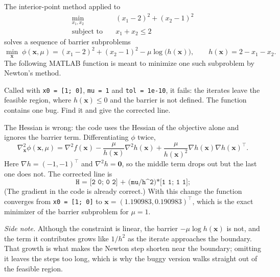 \begin{exercise} %
    
    The interior-point method applied to
    \[
    \begin{aligned}
        \min_{x_1, x_2} \quad & (x_1 - 2)^2 + (x_2 - 1)^2 \\
        \text{subject to} \quad & x_1 + x_2 \le 2
    \end{aligned}
    \]
    solves a sequence of barrier subproblems
    \[
        \min_{\mathbf{x}} \; \phi(\mathbf{x}, \mu) = (x_1 - 2)^2 + (x_2 - 1)^2 - \mu \log\big(h(\mathbf{x})\big),
        \qquad h(\mathbf{x}) = 2 - x_1 - x_2 .
    \]
    The following MATLAB function is meant to minimize one such subproblem by Newton's method.
    
    Called with \texttt{x0 = [1; 0]}, \texttt{mu = 1} and \texttt{tol = 1e-10}, it fails: the iterates leave the feasible region, where $h(\mathbf{x}) \le 0$ and the barrier is not defined. The function contains one bug. Find it and give the corrected line.
    
\end{exercise}

\begin{solution}
    
    The Hessian is wrong: the code uses the Hessian of the objective alone and ignores the barrier term. Differentiating $\phi$ twice,
    \[
        \nabla^2_{\mathbf{x}} \phi(\mathbf{x}, \mu)
        = \nabla^2 f(\mathbf{x}) - \frac{\mu}{h(\mathbf{x})} \nabla^2 h(\mathbf{x}) + \frac{\mu}{h(\mathbf{x})^2} \nabla h(\mathbf{x}) \nabla h(\mathbf{x})^\top .
    \]
    Here $\nabla h = (-1,-1)^\top$ and $\nabla^2 h = \mathbf{0}$, so the middle term drops out but the last one does not. The corrected line is
    \[
        \texttt{H = [2 0; 0 2] + (mu/h\textasciicircum 2)*[1 1; 1 1];}
    \]
    (The gradient in the code is already correct.) With this change the function converges from \texttt{x0 = [1; 0]} to $\mathbf{x} = (1.190983, 0.190983)^\top$, which is the exact minimizer of the barrier subproblem for $\mu = 1$.

    \emph{Side note.} Although the constraint is linear, the barrier $-\mu\log h(\mathbf{x})$ is not, and the term it contributes grows like $1/h^2$ as the iterate approaches the boundary. That growth is what makes the Newton step shorten near the boundary; omitting it leaves the steps too long, which is why the buggy version walks straight out of the feasible region.
    
\end{solution}

